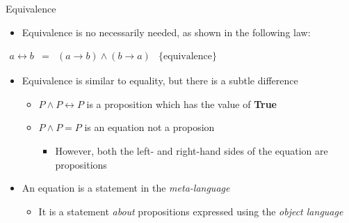 \documentclass[11pt,t,pdf,xcolor=svgnames,aspectratio=169]{beamer}
\providecommand{\tightlist}{%
  \setlength{\itemsep}{5pt}\setlength{\parskip}{0pt}}
\begin{document}
\begin{frame}{Equivalence}
\protect\hypertarget{equivalence}{}
\begin{itemize}
\tightlist
\item
  Equivalence is no necessarily needed, as shown in the following law:
\end{itemize}

\begin{center}
$\begin{array}{rcll}
a \leftrightarrow b & = & (a \to b) \land (b \to a) & \{\textrm{equivalence}\}
\end{array}$
\end{center}

\begin{itemize}
\tightlist
\item
  Equivalence is similar to equality, but there is a subtle difference

  \begin{itemize}
  \tightlist
  \item
    \(P \land P \leftrightarrow P\) is a proposition which has the value
    of \textbf{True}
  \item
    \(P \land P = P\) is an equation not a proposion

    \begin{itemize}
    \tightlist
    \item
      However, both the left- and right-hand sides of the equation are
      propositions
    \end{itemize}
  \end{itemize}
\item
  An equation is a statement in the \emph{meta-language}

  \begin{itemize}
  \tightlist
  \item
    It is a statement \emph{about} propositions expressed using the
    \emph{object language}
  \end{itemize}
\end{itemize}
\end{frame}

\end{document}
